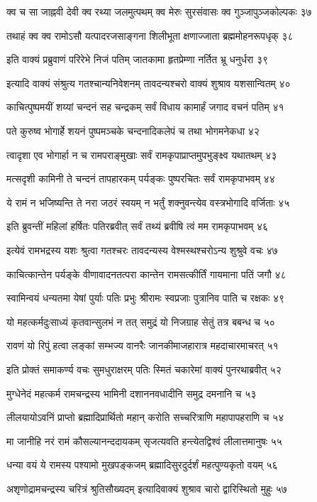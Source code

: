 क्व च सा जाह्नवी देवी क्व रथ्या जलमुत्पथम्
क्व मेरुः सुरसंवासः क्व गुञ्जापुञ्जकोल्पकः ३७

तथाहं क्व क्व रामोऽसौ यत्पादरजसाङ्गना
शिलीभूता क्षणाज्जाता ब्रह्ममोहनरूपधृक् ३८

इति वाक्यं प्रब्रुवाणं परिरेभे निजं पतिम्
जातकामा हृतप्रेम्णा नर्तित भ्रू धनुर्धरा ३९

इत्यादि वाक्यं संश्रुत्य गतश्चान्यनिवेशनम्
तावदन्यश्चरो वाक्यं शुश्राव यशसान्वितम् ४०

काचित्पुष्पमयीं शय्यां चन्दनं सह चन्द्रकम्
सर्वं विधाय कामार्हं जगाद वचनं पतिम् ४१

पते कुरुष्व भोगार्हे शयनं पुष्पमञ्चके
चन्दनादिकलेपं च तथा भोगमनेकधा ४२

त्वादृशा एव भोगार्हा न च रामपराङ्मुखाः
सर्वं रामकृपाप्राप्तमुपभुङ्क्ष्व यथातथम् ४३

मत्सदृशी कामिनी ते चन्दनं तापहारकम्
पर्यङ्कः पुष्परचितः सर्वं रामकृपाभवम् ४४

ये रामं न भजिष्यन्ति ते नरा जठरं स्वयम्
न भर्तुं शक्नुवन्त्येव वस्त्रभोगादि वर्जिताः ४५

इति ब्रुवन्तीं महिलां हर्षितः पतिरब्रवीत्
सर्वं तथ्यं ब्रवीषि त्वं मम रामकृपाभवम् ४६

इत्येवं रामभद्रस्य यशः श्रुत्वा गतश्चरः
तावदन्यस्य वेश्मस्थश्चरोऽन्य शुश्रुवे वचः ४७

काचित्कान्तेन पर्यङ्के वीणावादनतत्परा
कान्तेन रामसत्कीर्तिं गायमाना पतिं जगौ ४८

स्वामिन्वयं धन्यतमा येषां पुर्याः पतिः प्रभुः
श्रीरामः स्वप्रजाः पुत्रानिव पाति च रक्षकः ४९

यो महत्कर्मदुःसाध्यं कृतवान्सुलभं न तत्
समुद्रं यो निजग्राह सेतुं तत्र बबन्ध च ५०

रावणं यो रिपुं हत्वा लङ्कां सम्भज्य वानरैः
जानकीमाजहारात्र महदाचारमाचरत् ५१

इति प्रोक्तं समाकर्ण्य वचः सुमधुराक्षरम्
पतिः स्मितं चकारेमां वाक्यं पुनरथाब्रवीत् ५२

मुग्धेनेदं महत्कर्म रामचन्द्रस्य भामिनी
दशाननवधादीनि समुद्र दमनानि च ५३

लीलयायोऽवनिं प्राप्तो ब्रह्मादिप्रार्थितो महान्
करोति सच्चरित्राणि महापापहराणि च ५४

मा जानीहि नरं रामं कौसल्यानन्ददायकम्
सृजत्यवति हन्त्येतद्विश्वं लीलात्तमानुषः ५५

धन्या वयं ये रामस्य पश्यामो मुखपङ्कजम्
ब्रह्मादिसुरदुर्दर्शं महत्पुण्यकृतो वयम् ५६

अशृणोद्रामचन्द्रस्य चरित्रं श्रुतिसौख्यदम्
इत्यादिवाक्यं शुश्राव चारो द्वारिस्थितो मुहुः ५७

